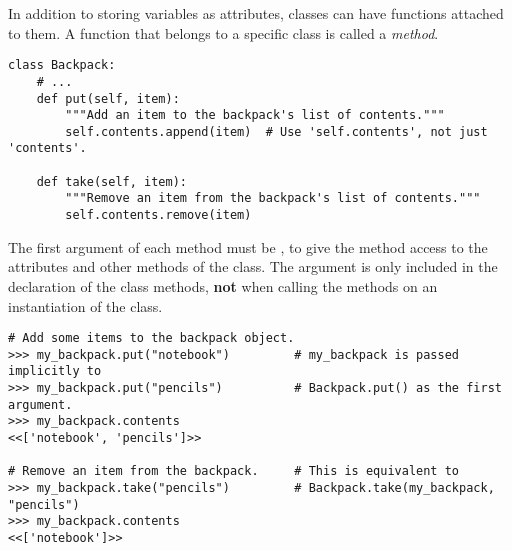 In addition to storing variables as attributes, classes can have functions attached to them.
A function that belongs to a specific class is called a \emph{method}.

\begin{lstlisting}
class Backpack:
    # ...
    def put(self, item):
        """Add an item to the backpack's list of contents."""
        self.contents.append(item)  # Use 'self.contents', not just 'contents'.

    def take(self, item):
        """Remove an item from the backpack's list of contents."""
        self.contents.remove(item)
\end{lstlisting}

The first argument of each method must be , to give the method access to the attributes and other methods of the class.
The  argument is only included in the declaration of the class methods, \textbf{not} when calling the methods on an instantiation of the class.

\begin{lstlisting}
# Add some items to the backpack object.
>>> my_backpack.put("notebook")         # my_backpack is passed implicitly to
>>> my_backpack.put("pencils")          # Backpack.put() as the first argument.
>>> my_backpack.contents
<<['notebook', 'pencils']>>

# Remove an item from the backpack.     # This is equivalent to
>>> my_backpack.take("pencils")         # Backpack.take(my_backpack, "pencils")
>>> my_backpack.contents
<<['notebook']>>
\end{lstlisting}

